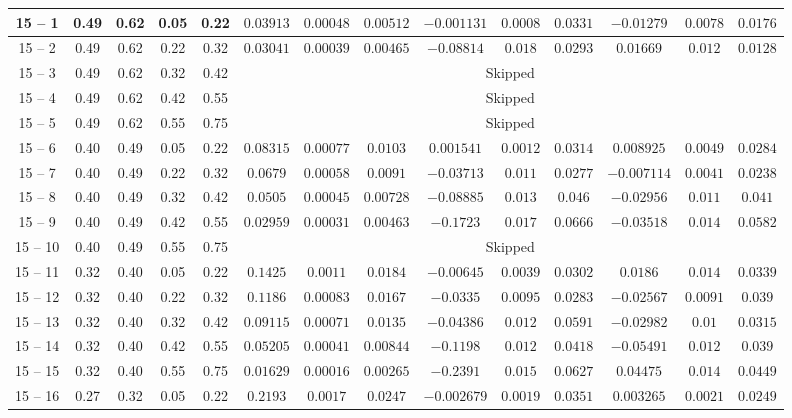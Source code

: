 \begin{longtable}{|*{14}{c|}}
\hline
15 -- 1 & 0.49 & 0.62 & 0.05 & 0.22 & $0.03913$ & $0.00048$ & $0.00512$ & $-0.001131$ & $0.0008$ & $0.0331$ & $-0.01279$ & $0.0078$ & $0.0176$ \\
\hline
15 -- 2 & 0.49 & 0.62 & 0.22 & 0.32 & $0.03041$ & $0.00039$ & $0.00465$ & $-0.08814$ & $0.018$ & $0.0293$ & $0.01669$ & $0.012$ & $0.0128$ \\
\hline
15 -- 3 & 0.49 & 0.62 & 0.32 & 0.42 & \multicolumn{9}{c|}{Skipped} \\
\hline
15 -- 4 & 0.49 & 0.62 & 0.42 & 0.55 & \multicolumn{9}{c|}{Skipped} \\
\hline
15 -- 5 & 0.49 & 0.62 & 0.55 & 0.75 & \multicolumn{9}{c|}{Skipped} \\
\hline
15 -- 6 & 0.40 & 0.49 & 0.05 & 0.22 & $0.08315$ & $0.00077$ & $0.0103$ & $0.001541$ & $0.0012$ & $0.0314$ & $0.008925$ & $0.0049$ & $0.0284$ \\
\hline
15 -- 7 & 0.40 & 0.49 & 0.22 & 0.32 & $0.0679$ & $0.00058$ & $0.0091$ & $-0.03713$ & $0.011$ & $0.0277$ & $-0.007114$ & $0.0041$ & $0.0238$ \\
\hline
15 -- 8 & 0.40 & 0.49 & 0.32 & 0.42 & $0.0505$ & $0.00045$ & $0.00728$ & $-0.08885$ & $0.013$ & $0.046$ & $-0.02956$ & $0.011$ & $0.041$ \\
\hline
15 -- 9 & 0.40 & 0.49 & 0.42 & 0.55 & $0.02959$ & $0.00031$ & $0.00463$ & $-0.1723$ & $0.017$ & $0.0666$ & $-0.03518$ & $0.014$ & $0.0582$ \\
\hline
15 -- 10 & 0.40 & 0.49 & 0.55 & 0.75 & \multicolumn{9}{c|}{Skipped} \\
\hline
15 -- 11 & 0.32 & 0.40 & 0.05 & 0.22 & $0.1425$ & $0.0011$ & $0.0184$ & $-0.00645$ & $0.0039$ & $0.0302$ & $0.0186$ & $0.014$ & $0.0339$ \\
\hline
15 -- 12 & 0.32 & 0.40 & 0.22 & 0.32 & $0.1186$ & $0.00083$ & $0.0167$ & $-0.0335$ & $0.0095$ & $0.0283$ & $-0.02567$ & $0.0091$ & $0.039$ \\
\hline
15 -- 13 & 0.32 & 0.40 & 0.32 & 0.42 & $0.09115$ & $0.00071$ & $0.0135$ & $-0.04386$ & $0.012$ & $0.0591$ & $-0.02982$ & $0.01$ & $0.0315$ \\
\hline
15 -- 14 & 0.32 & 0.40 & 0.42 & 0.55 & $0.05205$ & $0.00041$ & $0.00844$ & $-0.1198$ & $0.012$ & $0.0418$ & $-0.05491$ & $0.012$ & $0.039$ \\
\hline
15 -- 15 & 0.32 & 0.40 & 0.55 & 0.75 & $0.01629$ & $0.00016$ & $0.00265$ & $-0.2391$ & $0.015$ & $0.0627$ & $0.04475$ & $0.014$ & $0.0449$ \\
\hline
15 -- 16 & 0.27 & 0.32 & 0.05 & 0.22 & $0.2193$ & $0.0017$ & $0.0247$ & $-0.002679$ & $0.0019$ & $0.0351$ & $0.003265$ & $0.0021$ & $0.0249$ \\

\end{longtable}
